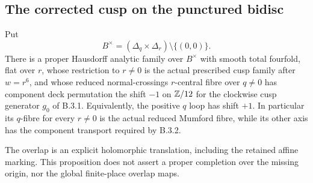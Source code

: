 \subsection{The corrected cusp on the punctured bidisc}

\begin{proposition}
\label{push:B418}
Put
\[
 B^\times=(\Delta_q\times\Delta_r)\setminus\{(0,0)\}.
\]
There is a proper Hausdorff analytic family over
$B^\times$ with smooth total fourfold, flat over $r$,
whose restriction to $r\ne0$ is the actual prescribed
cusp family after $w=r^6$, and whose reduced
normal-crossings $r$-central fibre over $q\ne0$ has
component deck permutation the shift $-1$ on $\mathbb Z/12$
for the clockwise cusp generator $g_0$ of B.3.1.
Equivalently, the positive $q$ loop has shift $+1$.
In particular its $q$-fibre for every $r\ne0$ is the
actual reduced Mumford fibre, while its other axis has
the component transport required by B.3.2.

The overlap is an explicit holomorphic translation,
including the retained affine marking. This proposition
does not assert a proper completion over the missing
origin, nor the global finite-place overlap maps.
\end{proposition}

